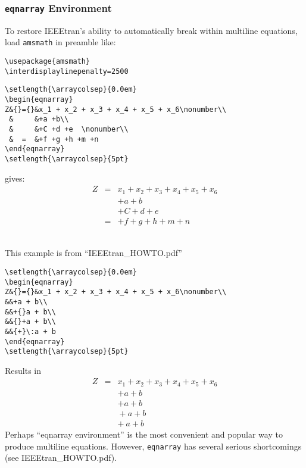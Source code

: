 \subsubsection{\texttt{\Large eqnarray} Environment}
To restore IEEEtran's ability to automatically break within multiline equations, load \texttt{amsmath} in preamble like:
%
\begin{verbatim}
\usepackage{amsmath}
\interdisplaylinepenalty=2500
\end{verbatim}
%
%
\raggedright{}
%
%
\begin{verbatim}
\setlength{\arraycolsep}{0.0em}
\begin{eqnarray}
Z&{}={}&x_1 + x_2 + x_3 + x_4 + x_5 + x_6\nonumber\\
 &     &+a +b\\
 &     &+C +d +e  \nonumber\\
 &  =  &+f +g +h +m +n
\end{eqnarray}
\setlength{\arraycolsep}{5pt}
\end{verbatim}
%
%
gives:
%
%
\setlength{\arraycolsep}{0.0em}
\begin{eqnarray}
Z&{}={}&x_1 + x_2 + x_3 + x_4 + x_5 + x_6\nonumber\\
&     &+a +b\\
&     &+C +d +e  \nonumber\\
&  =  &+f +g +h +m +n
\end{eqnarray}
\setlength{\arraycolsep}{5pt}
%
%
\raggedright{}\\
%
This example is from ``IEEEtran\_HOWTO.pdf''
%
%
\begin{verbatim}
\setlength{\arraycolsep}{0.0em}
\begin{eqnarray}
Z&{}={}&x_1 + x_2 + x_3 + x_4 + x_5 + x_6\nonumber\\
&&+a + b\\
&&+{}a + b\\
&&{}+a + b\\
&&{+}\:a + b
\end{eqnarray}
\setlength{\arraycolsep}{5pt}
\end{verbatim}
%
%
Results in
\setlength{\arraycolsep}{0.0em}
\begin{eqnarray}
Z&{}={}&x_1 + x_2 + x_3 + x_4 + x_5 + x_6\nonumber\\
&&+a + b\\
&&+{}a + b\\
&&{}+a + b\\
&&{+}\:a + b
\end{eqnarray}
\setlength{\arraycolsep}{5pt}
%
%
Perhaps ``eqnarray environment'' is the most convenient and popular way to produce multiline equations. However, \texttt{eqnarray} has several serious shortcomings (see IEEEtran\_HOWTO.pdf).
%
%
